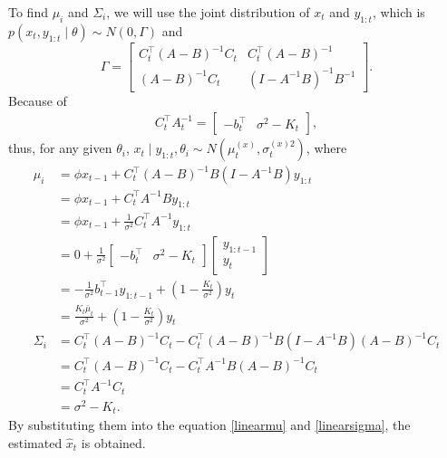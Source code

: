 To find $\mu_i$ and $\Sigma_i$, we will use the joint distribution of $x_{t}$ and $y_{1:t}$, which is $p\left(x_{t}, y_{1:t}  \mid  \theta\right)\sim N\left(0,\Gamma\right)$ and 
\begin{equation*}
\Gamma=\begin{bmatrix} C_{t}^\top\left(A-B\right)^{-1}C_{t} & C_{t}^\top\left(A-B\right)^{-1}\\\left(A-B\right)^{-1}C_{t} & \left(I-A^{-1}B\right)^{-1}B^{-1} \end{bmatrix}.
\end{equation*}
Because of 
\begin{align*}
C_{t}^\top A_{t}^{-1} = \begin{bmatrix} - b_{t}^\top & \sigma^2- K_{t} \end{bmatrix},
\end{align*}
thus, for any given $\theta_i$, $x_{t}\mid y_{1:t},\theta_i \sim N\left(\mu_{t}^{\left(x\right)},\sigma_{t}^{\left(x\right)2}\right)$, where
\begin{align*}
\mu_i  &= \phi \hat{x}_{t-1} +  C_{t}^\top \left(A-B\right)^{-1}B \left(I-A^{-1}B\right)y_{1:t}\\
                      &= \phi \hat{x}_{t-1} +  C_{t}^\top A^{-1}B y_{1:t} \\ &= \phi \hat{x}_{t-1} +  \frac{1}{\sigma^2}C_{t}^\top A^{-1} y_{1:t}\\
                      &=0+  \frac{1}{\sigma^2}\begin{bmatrix} - b_{t}^\top & \sigma^2- K_{t} \end{bmatrix} \begin{bmatrix} y_{1:t-1} \\ y_{t} \end{bmatrix}  \\
                      &= - \frac{1}{\sigma^2}b_{t-1}^\top y_{1:t-1}+\left(1-\frac{K_{t}}{\sigma^2}\right)y_{t}\\
                      &=\frac{K_{t}\bar{\mu}_{t}}{\sigma^2}+\left(1-\frac{K_{t}}{\sigma^2}\right)y_{t} \\
\Sigma_i&=C_{t}^\top\left(A-B\right)^{-1}C_{t}-  C_{t}^\top\left(A-B\right)^{-1}  B\left(I-A^{-1}B\right) \left(A-B\right)^{-1}C_{t}\\
                      &= C_{t}^\top\left(A-B\right)^{-1}C_{t} -  C_{t}^\top A^{-1}B\left(A-B\right)^{-1}C_{t}\\
                      &= C_{t}^\top A^{-1}C_{t} \\ &= \sigma^2-K_{t}.
\end{align*}
By substituting them into the equation \eqref{linearmu} and \eqref{linearsigma}, the estimated $\hat{x}_t$ is obtained. 



